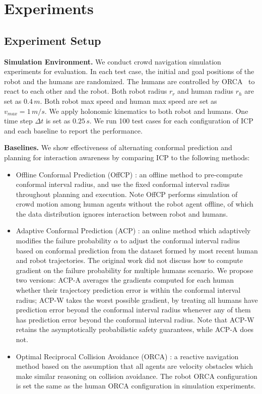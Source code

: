 \section{Experiments}\label{sec-experiments}

\subsection{Experiment Setup}

\textbf{Simulation Environment.} We conduct crowd navigation simulation experiments for evaluation. In each test case, the initial and goal positions of the robot and the humans are randomized. The humans are controlled by ORCA~\cite{van2011reciprocal} to react to each other and the robot. Both robot radius $r_r$ and human radius $r_h$ are set as $0.4\,m$. Both robot max speed and human max speed are set as $v_{max} = 1 \,m/s$. We apply holonomic kinematics to both robot and humans. One time step $\Delta t$ is set as $0.25\,s$. We run 100 test cases for each configuration of ICP and each baseline to report the performance.

\textbf{Baselines.} We show effectiveness of alternating conformal prediction and planning for interaction awareness by comparing ICP to the following methods: 

\begin{itemize}
    \item Offline Conformal Prediction (OffCP) \cite{lindemann2023safe}: an offline method to pre-compute conformal interval radius, and use the fixed conformal interval radius throughout planning and execution. Note OffCP performs simulation of crowd motion among human agents without the robot agent offline, of which the data distribution ignores interaction between robot and humans.  
    \item Adaptive Conformal Prediction (ACP) \cite{dixit2023adaptive}: an online method which adaptively modifies the failure probability $\alpha$ to adjust the conformal interval radius based on conformal prediction from the dataset formed by most recent human and robot trajectories. The original work did not discuss how to compute gradient on the failure probability for multiple humans scenario. We propose two versions: ACP-A averages the gradients computed for each human whether their trajectory prediction error is within the conformal interval radius; ACP-W takes the worst possible gradient, by treating all humans have prediction error beyond the conformal interval radius whenever any of them has prediction error beyond the conformal interval radius. Note that ACP-W retains the asymptotically probabilistic safety guarantees, while ACP-A does not.
    \item Optimal Reciprocal Collision Avoidance (ORCA) \cite{van2011reciprocal}: a reactive navigation method based on the assumption that all agents are velocity obstacles which make similar reasoning on collision avoidance. The robot ORCA configuration is set the same as the human ORCA configuration in simulation experiments. 
\end{itemize}

